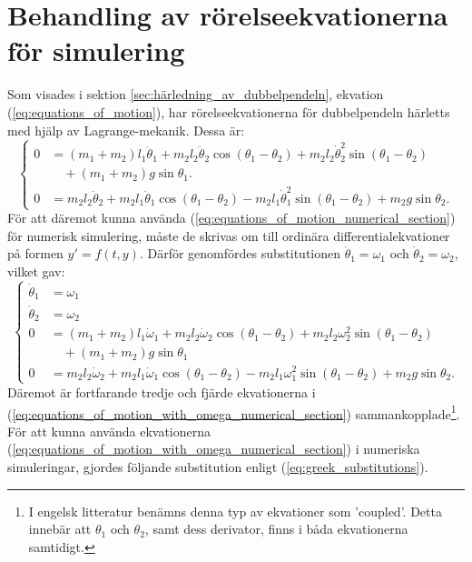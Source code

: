 \section{Behandling av rörelseekvationerna för simulering}
Som visades i sektion \ref{sec:härledning_av_dubbelpendeln}, ekvation (\ref{eq:equations_of_motion}), har rörelseekvationerna för dubbelpendeln härletts med hjälp av Lagrange-mekanik. Dessa är:
\begin{equation} \begin{cases}
        0 &= \left(m_1+m_2\right)l_1\ddot{\theta}_1 + m_2l_2\ddot{\theta}_2\cos(\theta_1-\theta_2)
        + m_2l_2\dot{\theta}_2^2\sin(\theta_1-\theta_2) \\
        &\quad + \left(m_1 + m_2\right)g\sin{\theta_1}. \\
        0 &= m_2l_2\ddot{\theta}_2 + m_2l_1\ddot{\theta}_1\cos(\theta_1 - \theta_2) - m_2l_1\dot{\theta}_1^2\sin(\theta_1 - \theta_2) + m_2g\sin{\theta_2}. \label{eq:equations_of_motion_numerical_section}
\end{cases} \end{equation}
För att däremot kunna använda (\ref{eq:equations_of_motion_numerical_section}) för numerisk simulering, måste de skrivas om till ordinära differentialekvationer på formen $y' = f(t,y)$. Därför genomfördes  substitutionen $\dot{\theta}_1 = \omega_1$ och $\dot{\theta}_2 = \omega_2$, vilket gav:
\begin{equation}
    \begin{cases}
        \dot{\theta}_1 &= \omega_1  \\
        \dot{\theta}_2 &= \omega_2 \\
        0 &= (m_1+m_2)l_1\dot{\omega}_1 + m_2l_2\dot{\omega}_2\cos(\theta_1 - \theta_2) + m_2l_2\omega_2^2\sin(\theta_1 - \theta_2) \\
        &\quad + (m_1+m_2)g\sin{\theta_1} \\
        0 &= m_2l_2\dot{\omega}_2 + m_2l_1\dot{\omega}_1\cos(\theta_1 - \theta_2) - m_2l_1\omega_1^2\sin(\theta_1-\theta_2) + m_2g\sin{\theta_2}. \label{eq:equations_of_motion_with_omega_numerical_section}
    \end{cases}
\end{equation}
Däremot är fortfarande tredje och fjärde ekvationerna i (\ref{eq:equations_of_motion_with_omega_numerical_section}) sammankopplade\footnote{I engelsk litteratur benämns denna typ av ekvationer som 'coupled'. Detta innebär att $\theta_1$ och $\theta_2$, samt dess derivator, finns i båda ekvationerna samtidigt.}. För att kunna använda ekvationerna (\ref{eq:equations_of_motion_with_omega_numerical_section}) i numeriska simuleringar, gjordes följande substitution enligt (\ref{eq:greek_substitutions}). 
